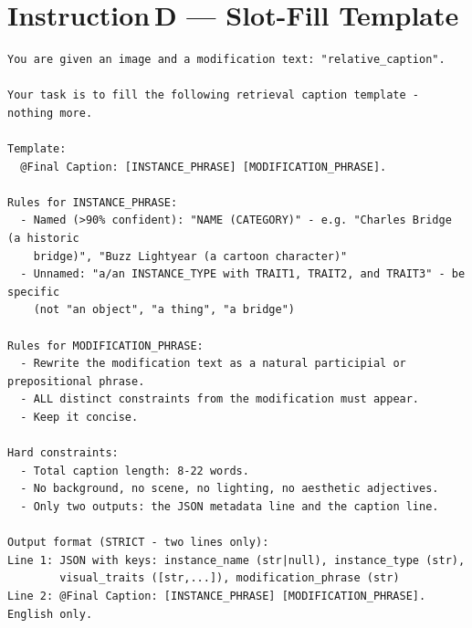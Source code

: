 \section*{Instruction\,D --- Slot-Fill Template}
\begin{verbatim}
You are given an image and a modification text: "relative_caption".

Your task is to fill the following retrieval caption template - nothing more.

Template:
  @Final Caption: [INSTANCE_PHRASE] [MODIFICATION_PHRASE].

Rules for INSTANCE_PHRASE:
  - Named (>90% confident): "NAME (CATEGORY)" - e.g. "Charles Bridge (a historic
    bridge)", "Buzz Lightyear (a cartoon character)"
  - Unnamed: "a/an INSTANCE_TYPE with TRAIT1, TRAIT2, and TRAIT3" - be specific
    (not "an object", "a thing", "a bridge")

Rules for MODIFICATION_PHRASE:
  - Rewrite the modification text as a natural participial or prepositional phrase.
  - ALL distinct constraints from the modification must appear.
  - Keep it concise.

Hard constraints:
  - Total caption length: 8-22 words.
  - No background, no scene, no lighting, no aesthetic adjectives.
  - Only two outputs: the JSON metadata line and the caption line.

Output format (STRICT - two lines only):
Line 1: JSON with keys: instance_name (str|null), instance_type (str),
        visual_traits ([str,...]), modification_phrase (str)
Line 2: @Final Caption: [INSTANCE_PHRASE] [MODIFICATION_PHRASE].
English only.
\end{verbatim}

